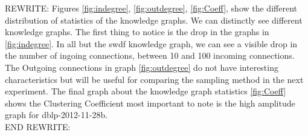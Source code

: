 \documentclass[11pt,letterpaper ,oneside ]{book}
\begin{document}
	\begin{table}[!t]
		\centering
		\caption{table showing several statistics about graphs.}
		\label{table:GraphStats}
	\end{table}
	REWRITE:
	Figures \ref{fig:indegree},  \ref{fig:outdegree},  \ref{fig:Coeff}, show the different distribution of statistics of the knowledge graphs. We can distinctly see different knowledge graphs. The first thing to notice is the drop in the graphs in \ref{fig:indegree}. In all but the swdf knowledge graph, we can see a visible drop in the number of ingoing connections, between 10 and 100 incoming connections. \\
	The Outgoing connections in graph \ref{fig:outdegree} do not have interesting characteristics but will be useful for comparing the sampling method in the next experiment. 
	The final graph about the knowledge graph statistics \ref{fig:Coeff} shows the Clustering Coefficient most important to note is the high amplitude graph for dblp-2012-11-28b. \\
	END REWRITE:
\end{document}

